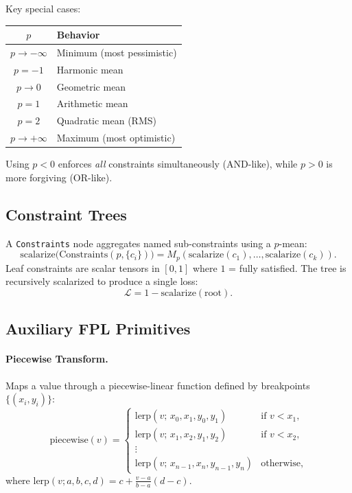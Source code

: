 \documentclass[11pt]{article}
\newcommand{\pmean}[2]{M_{#1}\!\left(#2\right)}
\theoremstyle{definition}
\begin{document}
Key special cases:
\begin{center}
\begin{tabular}{cl}
    \toprule
    $p$ & Behavior \\
    \midrule
    $p \to -\infty$ & Minimum (most pessimistic) \\
    $p = -1$        & Harmonic mean \\
    $p \to 0$       & Geometric mean \\
    $p = 1$         & Arithmetic mean \\
    $p = 2$         & Quadratic mean (RMS) \\
    $p \to +\infty$ & Maximum (most optimistic) \\
    \bottomrule
\end{tabular}
\end{center}

Using $p < 0$ enforces \emph{all} constraints simultaneously (AND-like),
while $p > 0$ is more forgiving (OR-like).

\subsection{Constraint Trees}

A \texttt{Constraints} node aggregates named sub-constraints using a $p$-mean:
\begin{equation}
    \text{scalarize}\bigl(\text{Constraints}(p, \{c_i\})\bigr)
    = \pmean{p}{\text{scalarize}(c_1), \dots, \text{scalarize}(c_k)}.
\end{equation}
Leaf constraints are scalar tensors in $[0,1]$ where $1$ = fully satisfied.
The tree is recursively scalarized to produce a single loss:
\[
    \mathcal{L} = 1 - \text{scalarize}(\text{root}).
\]

\subsection{Auxiliary FPL Primitives}

\paragraph{Piecewise Transform.}
Maps a value through a piecewise-linear function defined by breakpoints
$\{(x_i, y_i)\}$:
\[
    \text{piecewise}(v) = \begin{cases}
        \text{lerp}(v;\, x_0, x_1, y_0, y_1) & \text{if } v < x_1,\\
        \text{lerp}(v;\, x_1, x_2, y_1, y_2) & \text{if } v < x_2,\\
        \vdots \\
        \text{lerp}(v;\, x_{n-1}, x_n, y_{n-1}, y_n) & \text{otherwise},
    \end{cases}
\]
where $\text{lerp}(v; a, b, c, d) = c + \frac{v - a}{b - a}(d - c)$.
\end{document}
